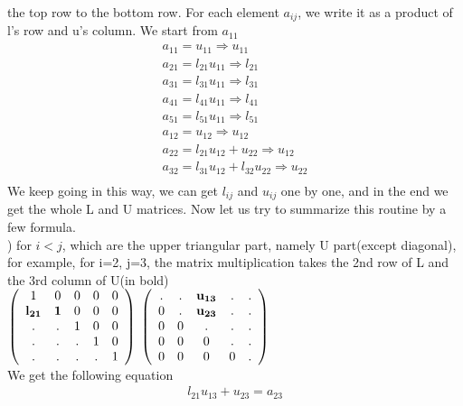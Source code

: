 \documentclass[a4paper]{article}
\begin{document}
the top row to the bottom row. For each element $a_{ij}$, we write it as a product of l's row and u's column.
We start from $a_{11}$\\
\begin{align*}
	a_{11} = u_{11} \Rightarrow u_{11}\\
	a_{21} = l_{21}u_{11} \Rightarrow l_{21}\\
	a_{31} = l_{31}u_{11} \Rightarrow l_{31}\\
	a_{41} = l_{41}u_{11} \Rightarrow l_{41}\\
	a_{51} = l_{51}u_{11} \Rightarrow l_{51}\\
	a_{12} = u_{12} \Rightarrow u_{12}\\
	a_{22} = l_{21}u_{12} + u_{22} \Rightarrow u_{12}\\
	a_{32} = l_{31}u_{12} + l_{32} u_{22} \Rightarrow u_{22}\\
\end{align*}
We keep going in this way, we can get $l_{ij}$ and $u_{ij}$ one by one, and in the end we get the whole L and U matrices. Now let us try to summarize this routine by a few formula.\\
) for $i<j$, which are the upper triangular part, namely U part(except diagonal), for example, for i=2, j=3, the matrix multiplication takes the 2nd row of L and the 3rd column of U(in bold)\\
$\left( \begin{array}{ccccc}
1      & 	0 	& 	0 	 & 	 0 		& 	0 	\\
	{\bf l_{21}} & 	{\bf 1} 	& 	0 	 &	 0 		& 	0	\\
. & . &   1  	 &   0		&	0	\\
. & . & . &   1 		& 	0	\\
. & . & . & . 	& 	1	\\\end{array} \right)$
$\left( \begin{array}{ccccc}
	. 	&  . &  {\bf u_{13}}  & 	. & . 	\\
	0	&  . & 	{\bf u_{23}}  &	. & .	\\
	0	& 	0	 &   .  & . &	.	\\
	0 	& 	0	 & 	 0		 &  . & 	.	\\
	0	& 	0	 & 	 0 		 &  0    & .	\\\end{array} \right)\\
$\\
We get the following equation
\begin{align*}
	l_{21}u_{13} + u_{23} = a_{23}
\end{align*}
\end{document}
